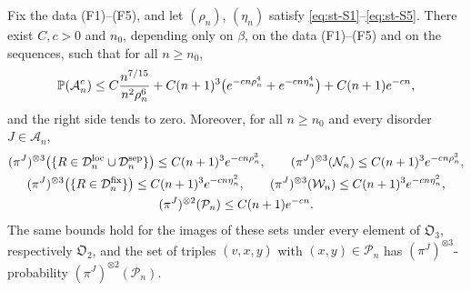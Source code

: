 \begin{lemma}\label{b:lem:static-event}
Fix the data \textup{(F1)--(F5)}, and let $(\rho_n)$, $(\eta_n)$ satisfy \eqref{eq:st-S1}--\eqref{eq:st-S5}. There exist $C,c>0$ and $n_0$, depending only on $\beta$, on the data \textup{(F1)--(F5)} and on the sequences, such that for all $n\ge n_0$,
\begin{equation}\label{b:eq:static-event-failure}
 \mathbb P(\mathcal A_n^c)\le C\frac{n^{7/15}}{n^2\rho_n^6}+C(n+1)^3\bigl(e^{-cn\rho_n^4}+e^{-cn\eta_n^4}\bigr)+C(n+1)e^{-cn},
\end{equation}
and the right side tends to zero. Moreover, for all $n\ge n_0$ and every disorder $J\in\mathcal A_n$,
\begin{equation}\label{b:eq:conditional-static-errors}
\begin{gathered}
 (\pi^J)^{\otimes3}\bigl(\{R\in\mathcal D^{\rm loc}_n\cup\mathcal D^{\rm sep}_n\}\bigr)\le C(n+1)^3e^{-cn\rho_n^3},\qquad
 (\pi^J)^{\otimes3}(\mathcal N_n)\le C(n+1)^3e^{-cn\rho_n^3},\\
 (\pi^J)^{\otimes3}\bigl(\{R\in\mathcal D^{\rm fix}_n\}\bigr)\le C(n+1)^3e^{-cn\eta_n^2},\qquad
 (\pi^J)^{\otimes3}(\mathcal W_n)\le C(n+1)^3e^{-cn\eta_n^2},\\
 (\pi^J)^{\otimes2}(\mathcal P_n)\le C(n+1)e^{-cn}.
\end{gathered}
\end{equation}
The same bounds hold for the images of these sets under every element of $\mathfrak O_3$, respectively $\mathfrak O_2$, and the set of triples $(v,x,y)$ with $(x,y)\in\mathcal P_n$ has $(\pi^J)^{\otimes3}$-probability $(\pi^J)^{\otimes2}(\mathcal P_n)$.
\end{lemma}

